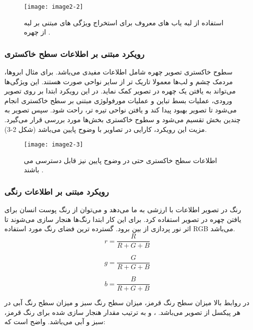 \begin{figure}[h]
\centering
  \texttt{[image: image2-2]}
  \caption{استفاده از لبه یاب های معروف برای استخراج ویژگی های مبتنی بر لبه از چهره  \cite{ref1}.}
  \label{image2-2}
\end{figure}

\subsubsection{رویکرد مبتنی بر اطلاعات سطح خاکستری} 
سطوح خاکستری تصویر چهره شامل اطلاعات مفیدی می‌باشد. برای مثال ابرو‌ها، مردمک چشم و لب‌ها معمولا تاریک تر از سایر نواحی صورت هستند. این ویژگی‌ها می‌تواند به یافتن یک چهره در تصویر کمک نماید. در این رویکرد ابتدا بر روی تصویر ورودی، عملیات بسط تباین  و عملیات مورفولوژی  مبتنی بر سطح خاکستری انجام می‌شود تا تصویر بهبود پیدا کند و یافتن نواحی تیره تر، راحت شود. سپس تصویر به چندین بخش تقسیم می‌شود و سطوح خاکستری بخش‌ها مورد بررسی قرار می‌گیرد. مزیت این رویکرد، کارایی در تصاویر با وضوح پایین می‌باشد (شکل 2-3).

\begin{figure}[h]
\centering
  \texttt{[image: image2-3]}
  \caption{اطلاعات سطح خاکستری حتی در وضوح پایین نیز قابل دسترسی می باشند  \cite{ref1}.}
  \label{image2-3}
\end{figure}

\subsubsection{رویکرد مبتنی بر اطلاعات رنگی}
رنگ در تصویر اطلاعات با ارزشی به ما می‌دهد و می‌توان از رنگ پوست انسان برای یافتن چهره در تصویر استفاده کرد. برای این کار ابتدا رنگ‌ها هنجار سازی  می‌شوند تا اثر نور پردازی از بین برود. گسترده ترین فضای رنگ مورد استفاده RGB می‌باشد.
\begin{equation}\label{eq2-1}
r = \frac{R}{R + G + B}
\end{equation}

\begin{equation}\label{eq2-2}
g = \frac{G}{R + G + B}
\end{equation}

\begin{equation}\label{eq2-3}
b = \frac{B}{R + G + B}
\end{equation}

در روابط بالا  میزان سطح رنگ قرمز،  میزان سطح رنگ سبز و  میزان سطح رنگ آبی در هر پیکسل از تصویر می‌باشد. 
، 
و
به ترتیب مقدار هنجار سازی شده برای رنگ قرمز، سبز و آبی می‌باشد. واضح است که:
    
